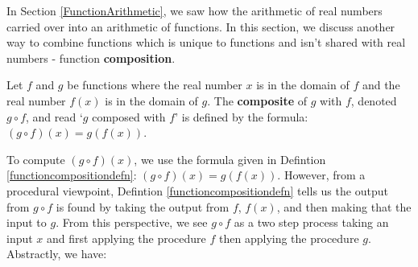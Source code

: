 \documentclass{ximera}
\begin{document}
	\author{Stitz-Zeager}




\setcounter{footnote}{0}

\label{FunctionComposition}

In Section \ref{FunctionArithmetic}, we saw how the arithmetic of real numbers carried over into an arithmetic of functions.  In this section, we discuss another way to combine functions which is unique to functions and isn't shared with real numbers - function \textbf{composition}.


\begin{definition} \label{functioncompositiondefn} Let $f$ and $g$ be functions where the real number $x$ is in the domain of $f$ and the real number $f(x)$ is in the domain of $g$.  The \textbf{composite} of $g$ with $f$, denoted $g \circ f$, and read `$g$ composed with $f$' is defined by the formula: $(g \circ f) (x) = g(f(x))$.

\end{definition}

To compute $(g \circ f)(x) $, we use the formula given in  Defintion \ref{functioncompositiondefn}:   $(g \circ f) (x) = g(f(x))$.  However, from a procedural viewpoint, Defintion \ref{functioncompositiondefn} tells us  the output from $g \circ f$ is found by taking the output from $f$, $f(x)$,  and then making that the input to $g$.   From this perspective, we see $g \circ f$ as a two step process taking an input $x$ and first applying the procedure $f$ then applying the procedure $g$.  Abstractly, we have:
\end{document}
